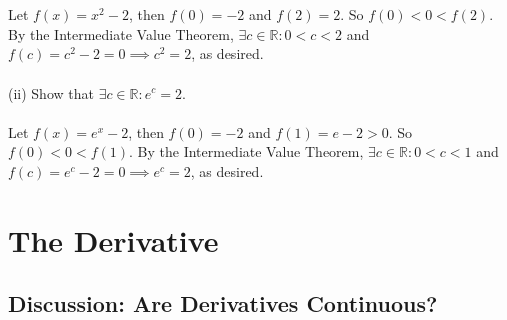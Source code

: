 \documentclass{article}
\begin{document}
            \\ \\
            Let $f(x) = x^2 - 2$, then $f(0) = -2$ and $f(2) = 2$. So $f(0)<0<f(2)$. By the Intermediate Value Theorem,
            $\exists c \in \mathbb{R}: 0 <c<2$ and $f(c) = c^2 - 2 = 0 \implies c^2 = 2$, as desired.
            \\ \\
            (ii) Show that $\exists c \in \mathbb{R}: e^c = 2$.
            \\ \\
            Let $f(x) = e^x -2$, then $f(0)=-2$ and $f(1)=e-2>0$. So $f(0)<0<f(1)$. By the Intermediate Value Theorem, $\exists c \in \mathbb{R}: 0 < c < 1$ and $f(c) = e^c -2 =0 \implies e^c = 2$, as desired.
            
            \section{The Derivative}
            \subsection{Discussion: Are Derivatives Continuous?}
            
\end{document}
